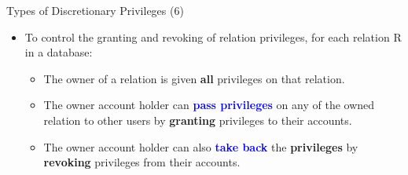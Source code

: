 
\begin{frame}{Types of Discretionary Privileges (6)}
    \Large %
    
    \begin{itemize}
        \vspace{-1.5cm} %
        
        \item To control the granting and revoking of relation privileges, for each relation R in a database:
        
        \begin{itemize}
            \large %
            \setlength{\itemsep}{0.3cm} %
            
            \item The owner of a relation is given \textbf{all} privileges on that relation.
            
            \item The owner account holder can \textbf{\textcolor{blue}{pass privileges}} on any of the owned relation to other users by \textbf{granting} privileges to their accounts.
            
            \item The owner account holder can also \textbf{\textcolor{blue}{take back}} the \textbf{privileges} by \textbf{revoking} privileges from their accounts.
        \end{itemize}
        
    \end{itemize}
\end{frame}


